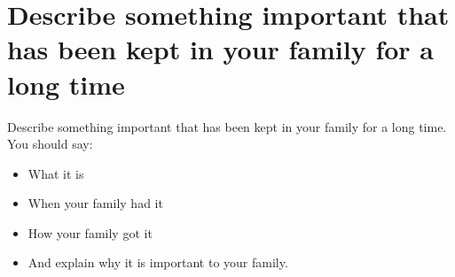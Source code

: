 \section{Describe something important that has been kept in your family for a long time}
\begin{ieltsprompt}
Describe something important that has been kept in your family for a long time.
You should say:
\begin{itemize}[leftmargin=2em, itemsep=2pt]
\item What it is
\item When your family had it
\item How your family got it
\item And explain why it is important to your family.
\end{itemize}
\end{ieltsprompt}
